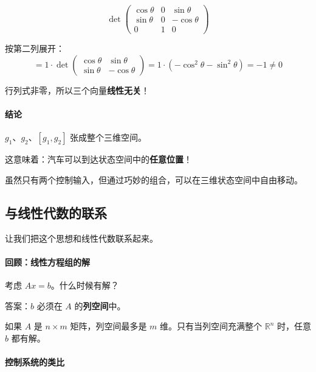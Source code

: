 \begin{equation}
\det \begin{pmatrix} \cos\theta & 0 & \sin\theta \\ \sin\theta & 0 & -\cos\theta \\ 0 & 1 & 0 \end{pmatrix}
\end{equation}

按第二列展开：
\begin{equation}
= 1 \cdot \det \begin{pmatrix} \cos\theta & \sin\theta \\ \sin\theta & -\cos\theta \end{pmatrix} = 1 \cdot (-\cos^2\theta - \sin^2\theta) = -1 \neq 0
\end{equation}

行列式非零，所以三个向量\textbf{线性无关}！

\paragraph{结论}

$g_1$、$g_2$、$[g_1, g_2]$ 张成整个三维空间。

这意味着：汽车可以到达状态空间中的\textbf{任意位置}！

虽然只有两个控制输入，但通过巧妙的组合，可以在三维状态空间中自由移动。

\subsection*{与线性代数的联系}

让我们把这个思想和线性代数联系起来。

\paragraph{回顾：线性方程组的解}

考虑 $Ax = b$。什么时候有解？

答案：$b$ 必须在 $A$ 的\textbf{列空间}中。

如果 $A$ 是 $n \times m$ 矩阵，列空间最多是 $m$ 维。只有当列空间充满整个 $\mathbb{R}^n$ 时，任意 $b$ 都有解。

\paragraph{控制系统的类比}

